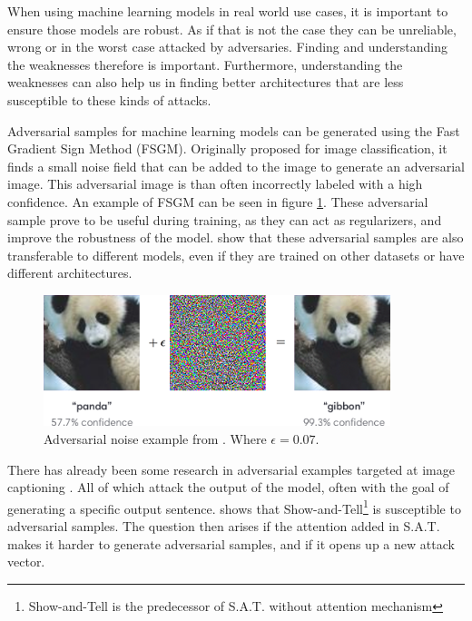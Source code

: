 When using machine learning models in real world use cases, it is important to ensure those models are robust. As if that is not the case they can be unreliable, wrong or in the worst case attacked by adversaries. Finding and understanding the weaknesses therefore is important. Furthermore, understanding the weaknesses can also help us in finding better architectures that are less susceptible to these kinds of attacks.

Adversarial samples for machine learning models can be generated using the Fast Gradient Sign Method (FSGM)\cite{goodfellow2015explaining}. Originally proposed for image classification, it finds a small noise field that can be added to the image to generate an adversarial image. This adversarial image is than often incorrectly labeled with a high confidence. An example of FSGM can be seen in figure \ref{adv_gibbon}. These adversarial sample prove to be useful during training, as they can act as regularizers, and improve the robustness of the model. \citeauthor{https://doi.org/10.48550/arxiv.1611.01236} show that these adversarial samples are also transferable to different models, even if they are trained on other datasets or have different architectures.

\begin{figure}[h]
    \centering
    \includegraphics[width=0.9\textwidth]{figures/adversarial_img_1.png}
    \caption{Adversarial noise example from \protect\cite{goodfellow2015explaining}. Where $\epsilon=0.07$.}
    \label{adv_gibbon}
\end{figure}

There has already been some research in adversarial examples targeted at image captioning \cite{https://doi.org/10.48550/arxiv.2107.03050,Hongge}. All of which attack the output of the model, often with the goal of generating a specific output sentence. \citeauthor{Hongge} shows that Show-and-Tell\footnote[1]{Show-and-Tell is the predecessor of S.A.T. without attention mechanism}\cite{showandtell} is susceptible to adversarial samples. The question then arises if the attention added in S.A.T. makes it harder to generate adversarial samples, and if it opens up a new attack vector.

